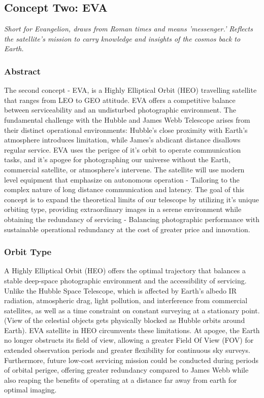 \subsection{Concept Two: EVA}
\begin{center}
    \textit{Short for Evangelion, draws from Roman times and means 'messenger.' Reflects the satellite's mission to carry knowledge and insights of the cosmos back to Earth.}
\end{center}
\subsubsection{Abstract} 
The second concept - EVA, is a Highly Elliptical Orbit (HEO) travelling satellite that ranges from LEO to GEO attitude. EVA offers a competitive balance between serviceability and an undisturbed photographic environment. The fundamental challenge with the Hubble and James Webb Telescope arises from their distinct operational environments: Hubble's close proximity with Earth's atmosphere introduces limitation, while James's abdicant distance disallows regular service. EVA uses the perigee of it's orbit to operate communication tasks, and it's apogee for photographing our universe without the Earth, commercial satellite, or atmosphere's intervene. The satellite will use modern level equipment that emphasize on autonomous operation - Tailoring to the complex nature of long distance communication and latency. The goal of this concept is to expand the theoretical limits of our telescope by utilizing it's unique orbiting type, providing extraordinary images in a serene environment while obtaining the redundancy of servicing - Balancing photographic performance with sustainable operational redundancy at the cost of greater price and innovation. 
\subsubsection{Orbit Type}
A Highly Elliptical Orbit (HEO) offers the optimal trajectory that balances a stable deep-space photographic environment and the accessibility of servicing. Unlike the Hubble Space Telescope, which is affected by Earth’s albedo IR radiation, atmospheric drag, light pollution, and interference from commercial satellites, as well as a time constraint on constant surveying at a stationary point. (View of the celestial objects gets physically blocked as Hubble orbits around Earth). EVA satellite in HEO circumvents these limitations. At apogee, the Earth no longer obstructs its field of view, allowing a greater Field Of View (FOV) for extended observation periods and greater flexibility for continuous sky surveys. Furthermore, future low-cost servicing mission could be conducted during periods of orbital perigee, offering greater redundancy compared to James Webb while also reaping the benefits of operating at a distance far away from earth for optimal imaging.  


